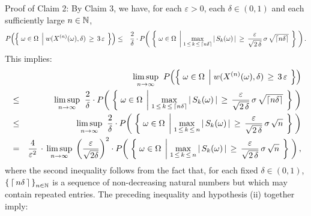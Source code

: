 \vskip 0.5cm
\noindent
Proof of Claim 2:\quad
By Claim 3, we have,
for each $\varepsilon > 0$, each $\delta \in (0,1)$ and each sufficiently large $n \in \mathbb{N}$,
\begin{eqnarray*}
P\!\left(\left\{\;
	\omega\in\Omega
	\;\left\vert\;
		\overset{{\color{white}1}}{w}(X^{(n)}(\omega),\delta)\,\geq\,3\,\varepsilon
	\right.
\;\right\}\right)
&\leq&
	\dfrac{2}{\delta} \cdot
	P\!\left(\;\left\{\; \omega\in\Omega \;\left\vert\;
		\underset{1\,\leq\,k\,\leq\,\lceil n\delta \rceil}{\max}
			\left\vert\, S_{k}(\omega) \,\right\vert
		\,\geq\,\dfrac{\varepsilon}{\sqrt{2\,\delta}}\,\sigma\,\sqrt{\lceil n\delta \rceil}
		\right.\;\right\}
		\;\right).
\end{eqnarray*}
This implies:
\begin{eqnarray*}
&&
	\underset{n\rightarrow\infty}{\limsup}\;\;
	P\!\left(\left\{\;
	\omega\in\Omega
	\;\left\vert\;
		\overset{{\color{white}1}}{w}(X^{(n)}(\omega),\delta)\,\geq\,3\,\varepsilon
	\right.
	\;\right\}\right)
\\
&\leq&
	\underset{n\rightarrow\infty}{\limsup}\;\;
	\dfrac{2}{\delta} \cdot
	P\!\left(\;\left\{\; \omega\in\Omega \;\left\vert\;
		\underset{1\,\leq\,k\,\leq\,\lceil n\delta \rceil}{\max}
			\left\vert\, S_{k}(\omega) \,\right\vert
		\,\geq\,\dfrac{\varepsilon}{\sqrt{2\,\delta}}\,\sigma\,\sqrt{\lceil n\delta \rceil}
		\right.\;\right\}
		\;\right)
\\
&\leq&
	\underset{n\rightarrow\infty}{\limsup}\;\;
	\dfrac{2}{\delta} \cdot
	P\!\left(\;\left\{\; \omega\in\Omega \;\left\vert\;
		\underset{1\,\leq\,k\,\leq\,n}{\max}
			\left\vert\, S_{k}(\omega) \,\right\vert
		\,\geq\,\dfrac{\varepsilon}{\sqrt{2\,\delta}}\,\sigma\,\sqrt{n}
		\right.\;\right\}
		\;\right)
\\
&=&
	\dfrac{4}{\varepsilon^{2}} \,\cdot\,
	\underset{n\rightarrow\infty}{\limsup}\;
	\left(\dfrac{\varepsilon}{\sqrt{2\delta}}\right)^{2}\cdot
	P\!\left(\;\left\{\; \omega\in\Omega \;\left\vert\;
		\underset{1\,\leq\,k\,\leq\,n}{\max}
			\left\vert\, S_{k}(\omega) \,\right\vert
		\,\geq\,\dfrac{\varepsilon}{\sqrt{2\,\delta}}\,\sigma\,\sqrt{n}
		\right.\;\right\}
		\;\right),
\end{eqnarray*}
where the second inequality follows from the fact that, for each fixed $\delta \in (0,1)$,
$\left\{\,\lceil\,n\delta\,\rceil\,\right\}_{n\in\mathbb{N}}$ is a sequence of non-decreasing
natural numbers but which may contain repeated entries.
The preceding inequality and hypothesis (ii) together imply:
